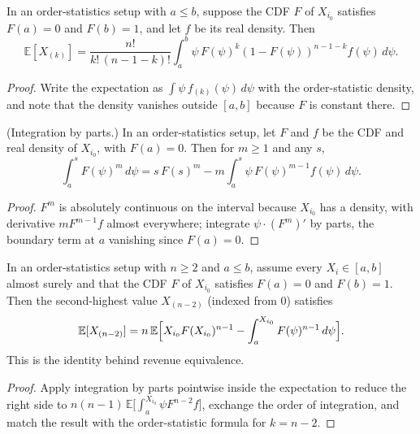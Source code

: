 \begin{lemma}\label{thm:MathEconLib.OrderStatisticsSetup.expected_val}\leanok
{}
In an order-statistics setup with $a\le b$, suppose the CDF $F$ of $X_{i_0}$ satisfies $F(a)=0$ and $F(b)=1$, and let $f$ be its real density. Then
\[
\mathbb{E}[X_{(k)}]=\frac{n!}{k!\,(n-1-k)!}\int_a^b\psi\,F(\psi)^k(1-F(\psi))^{n-1-k}f(\psi)\,d\psi .
\]
\end{lemma}
\begin{proof}\leanok
{}
Write the expectation as $\int\psi\,f_{(k)}(\psi)\,d\psi$ with the order-statistic density, and note that the density vanishes outside $[a,b]$ because $F$ is constant there.
\end{proof}

\begin{lemma}\label{thm:MathEconLib.OrderStatisticsSetup.integral_cdf_pow}\leanok
{}
(Integration by parts.) In an order-statistics setup, let $F$ and $f$ be the CDF and real density of $X_{i_0}$, with $F(a)=0$. Then for $m\ge1$ and any $s$,
\[
\int_a^s F(\psi)^m\,d\psi=s\,F(s)^m-m\int_a^s\psi\,F(\psi)^{m-1}f(\psi)\,d\psi .
\]
\end{lemma}
\begin{proof}\leanok
$F^m$ is absolutely continuous on the interval because $X_{i_0}$ has a density, with derivative $m F^{m-1}f$ almost everywhere; integrate $\psi\cdot(F^m)'$ by parts, the boundary term at $a$ vanishing since $F(a)=0$.
\end{proof}

\begin{theorem}\label{thm:MathEconLib.OrderStatisticsSetup.expected_second_highest}\leanok
{}
In an order-statistics setup with $n\ge2$ and $a\le b$, assume every $X_i\in[a,b]$ almost surely and that the CDF $F$ of $X_{i_0}$ satisfies $F(a)=0$ and $F(b)=1$. Then the second-highest value $X_{(n-2)}$ (indexed from $0$) satisfies
\[
\mathbb{E}[X_{(n-2)}]=n\,\mathbb{E}\Bigl[X_{i_0}F(X_{i_0})^{n-1}-\int_a^{X_{i_0}}F(\psi)^{n-1}\,d\psi\Bigr].
\]
This is the identity behind revenue equivalence.
\end{theorem}
\begin{proof}\leanok
{}
Apply integration by parts pointwise inside the expectation to reduce the right side to $n(n-1)\,\mathbb{E}\bigl[\int_a^{X_{i_0}}\psi F^{n-2}f\bigr]$, exchange the order of integration, and match the result with the order-statistic formula for $k=n-2$.
\end{proof}

